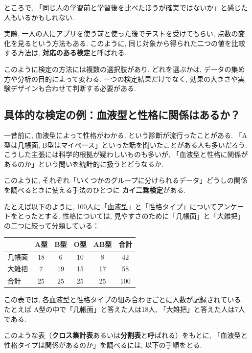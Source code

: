     ところで,
    「同じ人の学習前と学習後を比べたほうが確実ではないか」と感じた人もいるかもしれない.

    実際, 一人の人にアプリを使う前と使った後でテストを受けてもらい,
    点数の変化を見るという方法もある.
    このように, 同じ対象から得られた二つの値を比較する方法は,
    \textbf{対応のある検定}と呼ばれる.

    このように検定の方法には複数の選択肢があり,
    どれを選ぶかは, データの集め方や分析の目的によって変わる.
    一つの検定結果だけでなく, 効果の大きさや実験デザインも合わせて判断する必要がある.


  \subsection{具体的な検定の例：血液型と性格に関係はあるか？}

    一昔前に, 血液型によって性格がわかる, という診断が流行ったことがある.
    「A型は几帳面, B型はマイペース」といった話を聞いたことがある人も多いだろう.
    こうした主張には科学的根拠が疑わしいものも多いが,
    「血液型と性格に関係があるのか」という問いを統計的に扱うとどうなるか.

    このように, それぞれ「いくつかのグループに分けられるデータ」どうしの関係を調べるときに使える手法のひとつに
    \textbf{カイ二乗検定}がある.

    たとえば以下のように, 100人に「血液型」と「性格タイプ」についてアンケートをとったとする.
    性格については, 見やすさのために「几帳面」と「大雑把」の二つに絞って分類している：

    \begin{center}
      \begin{tabular}{l|cccc|c}
             & A型 & B型 & O型 & AB型 & 合計 \\
      \hline
      几帳面 & 18  & 6   & 10  & 8    & 42 \\
      大雑把 & 7   & 19  & 15  & 17   & 58 \\
      \hline
      合計   & 25  & 25  & 25  & 25   & 100
      \end{tabular}
    \end{center}

    この表では, 各血液型と性格タイプの組み合わせごとに人数が記録されている.
    たとえば A型の中で「几帳面」と答えた人は18人, 「大雑把」と答えた人は7人である.

    このような表（\textbf{クロス集計表}あるいは\textbf{分割表}と呼ばれる）をもとに,
    「血液型と性格タイプは関係があるのか」を調べるには, 以下の手順をとる.

